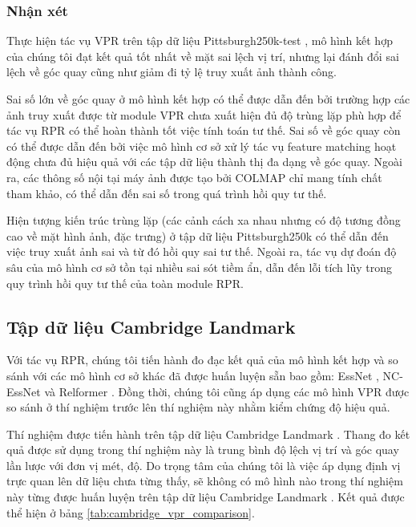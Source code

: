 \subsubsection*{Nhận xét}
Thực hiện tác vụ VPR trên tập dữ liệu Pittsburgh250k-test \cite{6618963}, mô hình kết hợp của chúng tôi đạt kết quả tốt nhất về mặt sai lệch vị trí, nhưng lại đánh đổi sai lệch về góc quay cũng như giảm đi tỷ lệ truy xuất ảnh thành công.

Sai số lớn về góc quay ở mô hình kết hợp có thể được dẫn đến bởi trường hợp các ảnh truy xuất được từ module VPR chưa xuất hiện đủ độ trùng lặp phù hợp để tác vụ RPR có thể hoàn thành tốt việc tính toán tư thế. Sai số về góc quay còn có thể được dẫn đến bởi việc mô hình cơ sở xử lý tác vụ feature matching hoạt động chưa đủ hiệu quả với các tập dữ liệu thành thị đa dạng về góc quay. Ngoài ra, các thông số nội tại máy ảnh được tạo bởi COLMAP\cite{schoenberger2016sfm} chỉ mang tính chất tham khảo, có thể dẫn đến sai số trong quá trình hồi quy tư thế.

Hiện tượng kiến trúc trùng lặp (các cảnh cách xa nhau nhưng có độ tương đồng cao về mặt hình ảnh, đặc trưng) ở tập dữ liệu Pittsburgh250k \cite{6618963} có thể dẫn đến việc truy xuất ảnh sai và từ đó hồi quy sai tư thế. Ngoài ra, tác vụ dự đoán độ sâu của mô hình cơ sở tồn tại nhiều sai sót tiềm ẩn, dẫn đến lỗi tích lũy trong quy trình hồi quy tư thế của toàn module RPR.

\subsection*{Tập dữ liệu Cambridge Landmark}

Với tác vụ RPR, chúng tôi tiến hành đo đạc kết quả của mô hình kết hợp và so sánh với các mô hình cơ sở khác đã được huấn luyện sẵn bao gồm: EssNet \cite{zhou2020learn}, NC-EssNet \cite{zhou2020learn} và Relformer \cite{idan2023learning}. Đồng thời, chúng tôi cũng áp dụng các mô hình VPR được so sánh ở thí nghiệm trước lên thí nghiệm này nhằm kiểm chứng độ hiệu quả.

Thí nghiệm được tiến hành trên tập dữ liệu Cambridge Landmark \cite{kendall2016posenet}. Thang đo kết quả được sử dụng trong thí nghiệm này là trung bình độ lệch vị trí và góc quay lần lược với đơn vị mét, độ. Do trọng tâm của chúng tôi là việc áp dụng định vị trực quan lên dữ liệu chưa từng thấy, sẽ không có mô hình nào trong thí nghiệm này từng được huấn luyện trên tập dữ liệu Cambridge Landmark \cite{kendall2016posenet}. Kết quả được thể hiện ở bảng \ref{tab:cambridge_vpr_comparison}.

